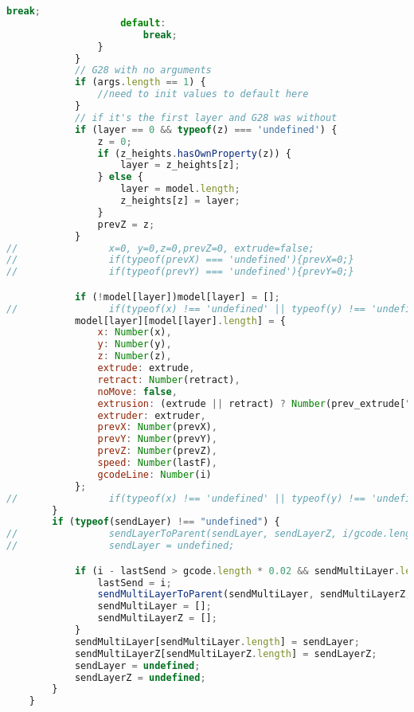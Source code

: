 \begin{lstlisting}[language=JavaScript, label={lst:Worker}, caption=Workerjs is the core gcode to D3 line processor.]
                        break;
                    default:
                        break;
                }
            }
            // G28 with no arguments
            if (args.length == 1) {
                //need to init values to default here
            }
            // if it's the first layer and G28 was without
            if (layer == 0 && typeof(z) === 'undefined') {
                z = 0;
                if (z_heights.hasOwnProperty(z)) {
                    layer = z_heights[z];
                } else {
                    layer = model.length;
                    z_heights[z] = layer;
                }
                prevZ = z;
            }
//                x=0, y=0,z=0,prevZ=0, extrude=false;
//                if(typeof(prevX) === 'undefined'){prevX=0;}
//                if(typeof(prevY) === 'undefined'){prevY=0;}

            if (!model[layer])model[layer] = [];
//                if(typeof(x) !== 'undefined' || typeof(y) !== 'undefined' ||typeof(z) !== 'undefined'||retract!=0)
            model[layer][model[layer].length] = {
                x: Number(x),
                y: Number(y),
                z: Number(z),
                extrude: extrude,
                retract: Number(retract),
                noMove: false,
                extrusion: (extrude || retract) ? Number(prev_extrude["abs"]) : 0,
                extruder: extruder,
                prevX: Number(prevX),
                prevY: Number(prevY),
                prevZ: Number(prevZ),
                speed: Number(lastF),
                gcodeLine: Number(i)
            };
//                if(typeof(x) !== 'undefined' || typeof(y) !== 'undefined' ||typeof(z) !== 'undefined') model[layer][model[layer].length] = {x: x, y: y, z: z, extrude: extrude, retract: retract, noMove:false, extrusion: (extrude||retract)?prev_extrude["abs"]:0, prevX: prevX, prevY: prevY, prevZ: prevZ, speed: lastF, gcodeLine: parseFloat(i)};
        }
        if (typeof(sendLayer) !== "undefined") {
//                sendLayerToParent(sendLayer, sendLayerZ, i/gcode.length*100);
//                sendLayer = undefined;

            if (i - lastSend > gcode.length * 0.02 && sendMultiLayer.length != 0) {
                lastSend = i;
                sendMultiLayerToParent(sendMultiLayer, sendMultiLayerZ, i / gcode.length * 100);
                sendMultiLayer = [];
                sendMultiLayerZ = [];
            }
            sendMultiLayer[sendMultiLayer.length] = sendLayer;
            sendMultiLayerZ[sendMultiLayerZ.length] = sendLayerZ;
            sendLayer = undefined;
            sendLayerZ = undefined;
        }
    }


\end{lstlisting}
